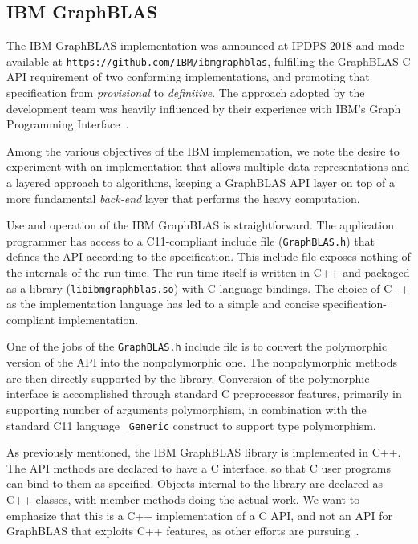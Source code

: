 \subsection{IBM GraphBLAS}

\newcommand{\code}[1]{{\tt #1}}

The IBM GraphBLAS implementation was announced at IPDPS 2018 and made
available at \code{https://github.com/IBM/ibmgraphblas}, fulfilling
the GraphBLAS C API requirement of two conforming implementations,
and promoting that specification from \emph{provisional} to
\emph{definitive}. The approach adopted by the development team was
heavily influenced by their experience with IBM's Graph Programming
Interface~\cite{gpi2016,GPI}.

Among the various objectives of the IBM implementation, we note the
desire to experiment with an implementation that allows multiple data
representations and a layered approach to algorithms, keeping a GraphBLAS
API layer on top of a more fundamental \emph{back-end} layer that performs
the heavy computation.

Use and operation of the IBM GraphBLAS is straightforward.
The application programmer has access to a C11-compliant include
file (\code{GraphBLAS.h}) that defines the API according to the
specification. This include file exposes nothing of the internals of
the run-time. The run-time itself is written in C++ and packaged as a
library (\code{libibmgraphblas.so}) with C language bindings.  The choice
of C++ as the implementation language has led to a simple and concise
specification-compliant implementation.

One of the jobs of the \code{GraphBLAS.h} include file is to
convert the polymorphic version of the API into the nonpolymorphic
one. The nonpolymorphic methods are then directly supported by the
library. Conversion of the polymorphic interface is accomplished through
standard C preprocessor features, primarily in supporting number of
arguments polymorphism, in combination with the standard C11 language
\code{\_Generic} construct to support type polymorphism.

As previously mentioned, the IBM GraphBLAS library is implemented in
C++. The API methods are declared to have a C interface, so that C user
programs can bind to them as specified. Objects internal to the library
are declared as C++ classes, with member methods doing the actual work.
We want to emphasize that this is a C++ implementation of a C API, and
not an API for GraphBLAS that exploits C++ features, as other efforts
are pursuing~\cite{gbtl-github}.

